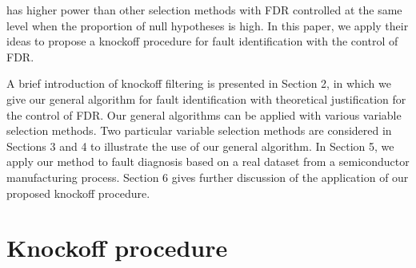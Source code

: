 \documentclass[]{interact}
\theoremstyle{plain}%
\theoremstyle{definition}
\theoremstyle{remark}
\begin{document}
has higher power than other selection methods with FDR controlled at the same level when the proportion of null hypotheses is high. In this paper, we apply their ideas to propose a knockoff procedure for fault identification with the control of FDR.

A brief introduction of knockoff filtering is presented in Section 2, in which we give our general algorithm for fault identification with theoretical justification for the control of FDR. Our general algorithms can be applied with various variable selection methods. Two particular variable selection methods are considered in Sections 3 and 4 to illustrate the use of our general algorithm. In Section 5, we apply our method to fault diagnosis based on a real dataset from a semiconductor manufacturing process. Section 6 gives further discussion of the application of our proposed knockoff procedure.


\section{Knockoff procedure}
\end{document}
